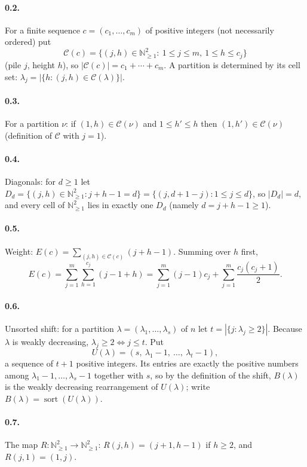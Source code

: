 \documentclass[11pt]{article}
\begin{document}
\paragraph{0.2.} For a finite sequence $c=(c_1,\ldots,c_m)$ of positive integers (not necessarily ordered) put
\[
\mathcal C(c)=\{(j,h)\in\mathbb N_{\ge1}^2:\ 1\le j\le m,\ 1\le h\le c_j\}
\]
(pile $j$, height $h$), so $|\mathcal C(c)|=c_1+\cdots+c_m$. A partition is determined by its cell set:
$\lambda_j=|\{h:(j,h)\in\mathcal C(\lambda)\}|$.

\paragraph{0.3.} For a partition $\nu$: if $(1,h)\in\mathcal C(\nu)$ and $1\le h'\le h$ then
$(1,h')\in\mathcal C(\nu)$ (definition of $\mathcal C$ with $j=1$).

\paragraph{0.4.} Diagonals: for $d\ge1$ let
$D_d=\{(j,h)\in\mathbb N_{\ge1}^2: j+h-1=d\}=\{(j,d+1-j):1\le j\le d\}$, so $|D_d|=d$, and every cell of
$\mathbb N_{\ge1}^2$ lies in exactly one $D_d$ (namely $d=j+h-1\ge1$).

\paragraph{0.5.} Weight: $E(c)=\sum_{(j,h)\in\mathcal C(c)}(j+h-1)$. Summing over $h$ first,
\[
E(c)=\sum_{j=1}^m\sum_{h=1}^{c_j}(j-1+h)=\sum_{j=1}^m (j-1)c_j+\sum_{j=1}^m\frac{c_j(c_j+1)}2 .
\]

\paragraph{0.6.} Unsorted shift: for a partition $\lambda=(\lambda_1,\ldots,\lambda_s)$ of $n$ let
$t=|\{j:\lambda_j\ge2\}|$. Because $\lambda$ is weakly decreasing, $\lambda_j\ge2\iff j\le t$. Put
\[
U(\lambda)=(s,\ \lambda_1-1,\ \ldots,\ \lambda_t-1),
\]
a sequence of $t+1$ positive integers. Its entries are exactly the positive numbers among
$\lambda_1-1,\ldots,\lambda_s-1$ together with $s$, so by the definition of the shift, $B(\lambda)$ is the weakly
decreasing rearrangement of $U(\lambda)$; write $B(\lambda)=\operatorname{sort}(U(\lambda))$.

\paragraph{0.7.} The map $R:\mathbb N_{\ge1}^2\to\mathbb N_{\ge1}^2$: $R(j,h)=(j+1,h-1)$ if $h\ge2$, and
$R(j,1)=(1,j)$.
\end{document}
